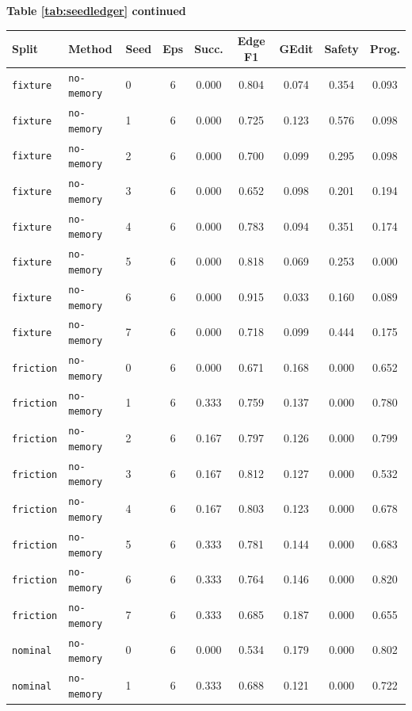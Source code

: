 \documentclass{article}
\begin{document}
\begin{center}
\textbf{Table \ref{tab:seedledger} continued}\\[0.4ex]
\begin{tabular}{lllcccccc}
\toprule
Split & Method & Seed & Eps & Succ. & Edge F1 & GEdit & Safety & Prog. \\
\midrule
\texttt{fixture} & \texttt{no-memory} & 0 & 6 & 0.000 & 0.804 & 0.074 & 0.354 & 0.093 \\
\texttt{fixture} & \texttt{no-memory} & 1 & 6 & 0.000 & 0.725 & 0.123 & 0.576 & 0.098 \\
\texttt{fixture} & \texttt{no-memory} & 2 & 6 & 0.000 & 0.700 & 0.099 & 0.295 & 0.098 \\
\texttt{fixture} & \texttt{no-memory} & 3 & 6 & 0.000 & 0.652 & 0.098 & 0.201 & 0.194 \\
\texttt{fixture} & \texttt{no-memory} & 4 & 6 & 0.000 & 0.783 & 0.094 & 0.351 & 0.174 \\
\texttt{fixture} & \texttt{no-memory} & 5 & 6 & 0.000 & 0.818 & 0.069 & 0.253 & 0.000 \\
\texttt{fixture} & \texttt{no-memory} & 6 & 6 & 0.000 & 0.915 & 0.033 & 0.160 & 0.089 \\
\texttt{fixture} & \texttt{no-memory} & 7 & 6 & 0.000 & 0.718 & 0.099 & 0.444 & 0.175 \\
\texttt{friction} & \texttt{no-memory} & 0 & 6 & 0.000 & 0.671 & 0.168 & 0.000 & 0.652 \\
\texttt{friction} & \texttt{no-memory} & 1 & 6 & 0.333 & 0.759 & 0.137 & 0.000 & 0.780 \\
\texttt{friction} & \texttt{no-memory} & 2 & 6 & 0.167 & 0.797 & 0.126 & 0.000 & 0.799 \\
\texttt{friction} & \texttt{no-memory} & 3 & 6 & 0.167 & 0.812 & 0.127 & 0.000 & 0.532 \\
\texttt{friction} & \texttt{no-memory} & 4 & 6 & 0.167 & 0.803 & 0.123 & 0.000 & 0.678 \\
\texttt{friction} & \texttt{no-memory} & 5 & 6 & 0.333 & 0.781 & 0.144 & 0.000 & 0.683 \\
\texttt{friction} & \texttt{no-memory} & 6 & 6 & 0.333 & 0.764 & 0.146 & 0.000 & 0.820 \\
\texttt{friction} & \texttt{no-memory} & 7 & 6 & 0.333 & 0.685 & 0.187 & 0.000 & 0.655 \\
\texttt{nominal} & \texttt{no-memory} & 0 & 6 & 0.000 & 0.534 & 0.179 & 0.000 & 0.802 \\
\texttt{nominal} & \texttt{no-memory} & 1 & 6 & 0.333 & 0.688 & 0.121 & 0.000 & 0.722 \\

\end{tabular}
\end{center}
\end{document}
